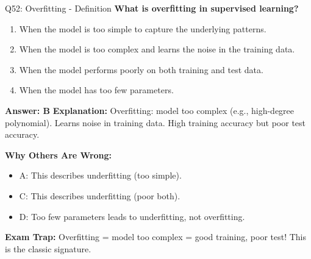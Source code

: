\documentclass[8pt]{beamer}
\begin{document}
	\begin{frame}{Q52: Overfitting - Definition}
		\fontsize{6.5}{7.5}\selectfont
		\textbf{What is overfitting in supervised learning?}
		
		\begin{enumerate}
			\item When the model is too simple to capture the underlying patterns.
			\item When the model is too complex and learns the noise in the training data.
			\item When the model performs poorly on both training and test data.
			\item When the model has too few parameters.
		\end{enumerate}
		
		\vspace{0.05cm}
		\textcolor{myblue}{\textbf{Answer: B}}
		\vspace{0.05cm}
		\textcolor{myblue}{\textbf{Explanation:}} Overfitting: model too complex (e.g., high-degree polynomial). Learns noise in training data. High training accuracy but poor test accuracy.
		
		\vspace{0.05cm}
		\textcolor{myred}{\textbf{Why Others Are Wrong:}}
		\begin{itemize}
			\item \textcolor{myred}{A:} This describes underfitting (too simple).
			\item \textcolor{myred}{C:} This describes underfitting (poor both).
			\item \textcolor{myred}{D:} Too few parameters leads to underfitting, not overfitting.
		\end{itemize}
		
		\textcolor{myred}{\textbf{Exam Trap:}} Overfitting = \textcolor{myblue}{model too complex} = good training, poor test! This is the classic signature.
	\end{frame}
	
\end{document}
